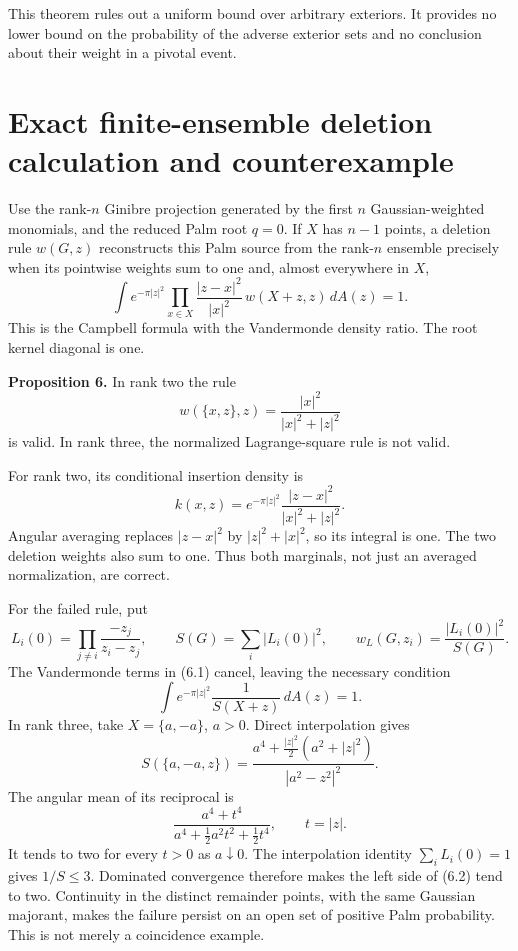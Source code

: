 \documentclass[11pt,a4paper]{article}
\theoremstyle{definition}
\theoremstyle{remark}
\numberwithin{equation}{section}
\begin{document}
This theorem rules out a uniform bound over arbitrary exteriors. It provides no lower bound on the probability of the adverse exterior sets and no conclusion about their weight in a pivotal event.

\hypertarget{exact-finite-ensemble-deletion-calculation-and-counterexample}{%
\section{Exact finite-ensemble deletion calculation and counterexample}\label{exact-finite-ensemble-deletion-calculation-and-counterexample}}

Use the rank-\(n\) Ginibre projection generated by the first \(n\) Gaussian-weighted monomials, and the reduced Palm root \(q=0\). If \(X\) has \(n-1\) points, a deletion rule \(w(G,z)\) reconstructs this Palm source from the rank-\(n\) ensemble precisely when its pointwise weights sum to one and, almost everywhere in \(X\), \[
\int e^{-\pi|z|^2}
\prod_{x\in X}\frac{|z-x|^2}{|x|^2}\,
w(X+z,z)\,dA(z)=1.
\tag{6.1}
\] This is the Campbell formula with the Vandermonde density ratio. The root kernel diagonal is one.

\textbf{Proposition 6.} In rank two the rule \[
w(\{x,z\},z)=\frac{|x|^2}{|x|^2+|z|^2}
\] is valid. In rank three, the normalized Lagrange-square rule is not valid.

For rank two, its conditional insertion density is \[
k(x,z)=e^{-\pi|z|^2}
\frac{|z-x|^2}{|x|^2+|z|^2}.
\] Angular averaging replaces \(|z-x|^2\) by \(|z|^2+|x|^2\), so its integral is one. The two deletion weights also sum to one. Thus both marginals, not just an averaged normalization, are correct.

For the failed rule, put \[
L_i(0)=\prod_{j\ne i}\frac{-z_j}{z_i-z_j},
\qquad S(G)=\sum_i|L_i(0)|^2,\qquad
w_L(G,z_i)=\frac{|L_i(0)|^2}{S(G)}.
\] The Vandermonde terms in (6.1) cancel, leaving the necessary condition \[
\int e^{-\pi|z|^2}\frac1{S(X+z)}\,dA(z)=1.
\tag{6.2}
\] In rank three, take \(X=\{a,-a\}\), \(a>0\). Direct interpolation gives \[
S(\{a,-a,z\})
=\frac{a^4+\frac{|z|^2}{2}(a^2+|z|^2)}
 {|a^2-z^2|^2}.
\] The angular mean of its reciprocal is \[
\frac{a^4+t^4}{a^4+\frac12a^2t^2+\frac12t^4},
\qquad t=|z|.
\] It tends to two for every \(t>0\) as \(a\downarrow0\). The interpolation identity \(\sum_iL_i(0)=1\) gives \(1/S\le3\). Dominated convergence therefore makes the left side of (6.2) tend to two. Continuity in the distinct remainder points, with the same Gaussian majorant, makes the failure persist on an open set of positive Palm probability. This is not merely a coincidence example.
\end{document}
